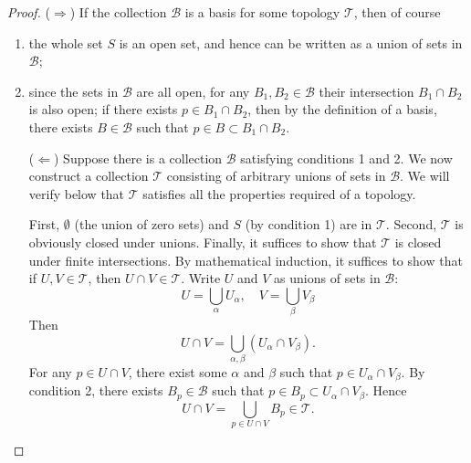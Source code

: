 \begin{proof}
	($\Longrightarrow$) If the collection $\mathcal{B}$ is a basis for some
	topology $\mathcal{T}$, then of course
	\begin{enumerate}
		\item the whole set $S$ is an open set, and hence can be written as a
		      union of sets in $\mathcal{B}$;
		\item since the sets in $\mathcal{B}$ are all open, for any $B_1, B_2
			      \in\mathcal{B}$ their intersection $B_1\cap B_2$ is also open; if
		      there exists $p\in B_1\cap B_2$, then by the definition of a basis,
		      there exists $B\in\mathcal{B}$ such that $p\in B\subset B_1\cap
			      B_2$.

		      ($\Longleftarrow$) Suppose there is a collection $\mathcal{B}$
		      satisfying conditions 1 and 2. We now construct a collection
		      $\mathcal{T}$ consisting of arbitrary unions of sets in
		      $\mathcal{B}$. We will verify below that $\mathcal{T}$ satisfies
		      all the properties required of a topology.

		      First, $\emptyset$ (the union of zero sets) and $S$ (by condition
		      1) are in $\mathcal{T}$. Second, $\mathcal{T}$ is obviously closed
		      under unions. Finally, it suffices to show that $\mathcal{T}$ is
		      closed under finite intersections. By mathematical induction, it
		      suffices to show that if $U,V\in\mathcal{T}$, then $U\cap
			      V\in\mathcal{T}$. Write $U$ and $V$ as unions of sets in
		      $\mathcal{B}$:
		      \begin{displaymath}
			      U = \bigcup_{\alpha}U_\alpha,\quad V = \bigcup_{\beta} V_\beta
		      \end{displaymath}
		      Then
		      \begin{displaymath}
			      U\cap V = \bigcup_{\alpha,\beta} (U_\alpha \cap V_\beta).
		      \end{displaymath}
		      For any $p\in U\cap V$, there exist some $\alpha$ and $\beta$ such
		      that $p\in U_\alpha\cap V_\beta$. By condition 2, there exists
		      $B_p\in\mathcal{B}$ such that $p\in B_p\subset U_\alpha\cap
			      V_\beta$. Hence
		      \begin{displaymath}
			      U\cap V = \bigcup_{p\in U\cap V} B_p \in\mathcal{T}.
		      \end{displaymath}

	\end{enumerate}
\end{proof}





